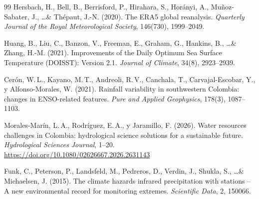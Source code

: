 \documentclass[12pt, a4paper]{article}
\begin{document}
\begin{thebibliography}{99}
	Hersbach, H., Bell, B., Berrisford, P., Hirahara, S., Hor\'anyi, A., Mu\~noz-Sabater, J., \ldots \& Th\'epaut, J.-N. (2020).
	The ERA5 global reanalysis.
	\textit{Quarterly Journal of the Royal Meteorological Society}, 146(730), 1999--2049.
	
	Huang, B., Liu, C., Banzon, V., Freeman, E., Graham, G., Hankins, B., \ldots \& Zhang, H.-M. (2021).
	Improvements of the Daily Optimum Sea Surface Temperature (DOISST): Version 2.1.
	\textit{Journal of Climate}, 34(8), 2923--2939.
	
	Cer\'on, W.\,L., Kayano, M.\,T., Andreoli, R.\,V., Canchala, T., Carvajal-Escobar, Y., y Alfonso-Morales, W. (2021).
	Rainfall variability in southwestern Colombia: changes in ENSO-related features.
	\textit{Pure and Applied Geophysics}, 178(3), 1087--1103.
	
	Morales-Mar\'in, L.\,A., Rodr\'iguez, E.\,A., y Jaramillo, F. (2026).
	Water resources challenges in Colombia: hydrological science solutions for a sustainable future.
	\textit{Hydrological Sciences Journal}, 1--20.
	\url{https://doi.org/10.1080/02626667.2026.2631143}
	
	Funk, C., Peterson, P., Landsfeld, M., Pedreros, D., Verdin, J., Shukla, S., \ldots \& Michaelsen, J. (2015).
	The climate hazards infrared precipitation with stations -- A new environmental record for monitoring extremes.
	\textit{Scientific Data}, 2, 150066.
	
\end{thebibliography}
\end{document}
